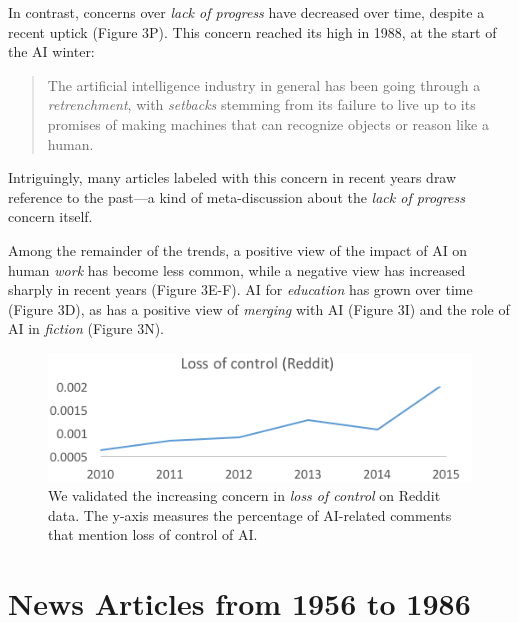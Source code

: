\documentclass[letterpaper]{article}
\begin{document}
In contrast, concerns over \textit{lack of progress} have decreased over time, despite a recent uptick (Figure 3P). This concern reached its high in 1988, at the start of the AI winter:
\begin{quote}
\small
The artificial intelligence industry in general has been going through a \textit{retrenchment}, with \textit{setbacks} stemming from its failure to live up to its promises of making machines that can recognize objects or reason like a human.
\normalsize
\end{quote}
Intriguingly, many articles labeled with this concern in recent years draw reference to the past---a kind of meta-discussion about the \textit{lack of progress} concern itself.

Among the remainder of the trends, a positive view of the impact of AI on human \textit{work} has become less common, while a negative view has increased sharply in recent years (Figure 3E-F). AI for \textit{education} has grown over time (Figure 3D), as has a positive view of \textit{merging} with AI (Figure 3I) and the role of AI in \textit{fiction} (Figure 3N).

\begin{figure}[!t]
\centering
\includegraphics[width=1.0\columnwidth]{ai-reddit2}
\caption{We validated the increasing concern in \textit{loss of control} on Reddit data. The y-axis measures the percentage of AI-related comments that mention loss of control of AI.}
\label{fig:replicate}
\end{figure}

\section{News Articles from 1956 to 1986}
\end{document}
